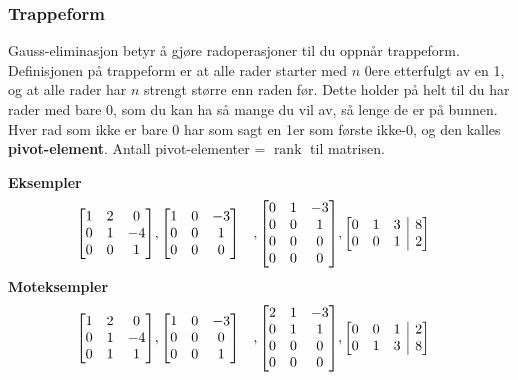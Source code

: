 \documentclass[12pt,a4paper,norsk]{article}
\makeatletter
\newcommand{\mat}[2]{\left[\begin{array}{@{}#1@{}}#2\end{array}\right]}
\DeclareMathOperator{\rank}{rank}
\makeatother
\begin{document}
\subsubsection{Trappeform}
Gauss-eliminasjon betyr å gjøre radoperasjoner til du oppnår trappeform.
Definisjonen på trappeform er at alle rader starter med $n$ 0ere etterfulgt av
en 1, og at alle rader har $n$ strengt større enn raden før. Dette holder på
helt til du har rader med bare 0, som du kan ha så mange du vil av, så lenge de
er på bunnen. Hver rad som ikke er bare 0 har som sagt en 1er som første ikke-0,
og den kalles \textbf{pivot-element}. Antall pivot-elementer = $\rank$ til
matrisen.

\textbf{Eksempler}
\begin{align*}
  \begin{bmatrix}
    1 & 2 & 0 \\
    0 & 1 & -4 \\
    0 & 0 & 1
  \end{bmatrix}
  &,
  \begin{bmatrix}
    1 & 0 & -3 \\
    0 & 0 & 1 \\
    0 & 0 & 0
  \end{bmatrix}
  &,
  \begin{bmatrix}
    0 & 1 & -3 \\
    0 & 0 & 1 \\
    0 & 0 & 0 \\
    0 & 0 & 0
  \end{bmatrix}
  &,
  \mat{ccc|c}{
    0 & 1 & 3 & 8 \\
    0 & 0 & 1 & 2 
  }
\end{align*}
%
\textbf{Moteksempler}
\begin{align*}
  \begin{bmatrix}
    1 & 2 & 0 \\
    0 & 1 & -4 \\
    0 & 1 & 1
  \end{bmatrix}
  &,
  \begin{bmatrix}
    1 & 0 & -3 \\
    0 & 0 & 0 \\
    0 & 0 & 1
  \end{bmatrix}
  &,
  \begin{bmatrix}
    2 & 1 & -3 \\
    0 & 1 & 1 \\
    0 & 0 & 0 \\
    0 & 0 & 0
  \end{bmatrix}
  &,
  \mat{ccc|c}{
    0 & 0 & 1 & 2 \\
    0 & 1 & 3 & 8
  }
\end{align*}
\end{document}
